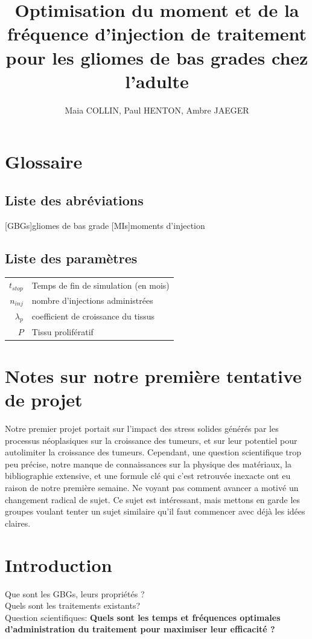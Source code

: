 \documentclass[12pt,a4paper]{article}
\title{Optimisation du moment et de la fréquence d'injection de traitement pour les gliomes de bas grades chez l'adulte}
\author{Maia COLLIN, Paul HENTON, Ambre JAEGER} %
\begin{document}
\maketitle
\tableofcontents

\section{Glossaire}
\subsection{Liste des abréviations}
\begin{acronym}
[GBGs]{gliomes de bas grade}
[MIs]{moments d'injection}
\end{acronym}
\subsection{Liste des paramètres}
\begin{tabular}{r l}
    $t_{stop}$ & Temps de fin de simulation (en mois)\\
    $n_{inj}$ & nombre d'injections administrées\\
    $\lambda_{p}$ & coefficient de croissance du tissus\\
    $P$ & Tissu prolifératif\\

    
\end{tabular}
\section{Notes sur notre première tentative de projet}
Notre premier projet portait sur l'impact des stress solides générés par les processus néoplasiques sur la croissance des tumeurs, et sur leur potentiel pour autolimiter la croissance des tumeurs. Cependant, une question scientifique trop peu précise, notre manque de connaissances sur la physique des matériaux, la bibliographie extensive, et une formule clé qui c'est retrouvée inexacte ont eu raison de notre première semaine. Ne voyant pas comment avancer a motivé un changement radical de sujet. Ce sujet est intéressant, mais mettons en garde les groupes voulant tenter un sujet similaire qu'il faut commencer avec déjà les idées claires.
\section{Introduction}
Que sont les \acp{GBG}, leurs propriétés ?\\
Quels sont les traitements existants?\\
Question scientifiques: \textbf{Quels sont les temps et fréquences optimales d'administration du traitement pour maximiser leur efficacité ?}
\end{document}
